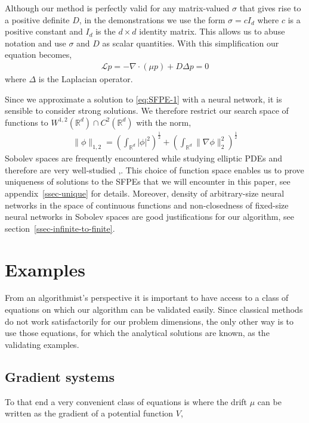 Although our method is perfectly valid for any matrix-valued $\sigma$ that gives rise to a positive definite $D$, in the demonstrations we use the form  $\sigma = c I_d$ where $c$ is a positive constant and $I_d$ is the $d\times d$ identity matrix. This allows us to abuse notation and use $\sigma$ and $D$ as scalar quantities. With this simplification our equation becomes, 
\begin{align}
    \mathcal L p= -\nabla\cdot(\mu p) + D\Delta p=0\label{eq:SFPE-1}
\end{align}
where $\Delta$ is the Laplacian operator. 

Since we approximate a solution to \eqref{eq:SFPE-1} with a neural network, it is sensible to consider strong solutions. We therefore  restrict our search space of functions to $W^{1, 2}(\mathbb R^d)\cap C^2(\mathbb R^d)$ with the norm,
\begin{align}
\|\phi\|_{1, 2} =\left(\int_{\mathbb R^d}|\phi|^2\right)^{\frac{1}{2}} + \left(\int_{\mathbb R^d}\|\nabla\phi\|_2^2\right)^{\frac{1}{2}}\label{eq:def-Sobolev-norm}
\end{align}
Sobolev spaces are frequently encountered while studying elliptic PDEs and therefore are very well-studied \cite{brezis2011functional},\cite{kilpelainen1994weighted}.  This choice of function space enables us to prove uniqueness of solutions to the SFPEs that we will encounter in this paper, see appendix~\ref{ssec-unique} for details. Moreover, density of arbitrary-size neural networks in the space of continuous functions \cite{pinkus1999approximation} and non-closedness of fixed-size neural networks in Sobolev spaces \cite{mahan2021nonclosedness} are good justifications for our algorithm, see section~\ref{ssec-infinite-to-finite}.

\section{Examples}\label{sec-examples}
From an algorithmist's perspective it is important to have access to a class of equations on which our algorithm can be validated easily. Since classical methods do not work satisfactorily for our problem dimensions, the only other way is to use those equations, for which the analytical solutions are known, as the validating examples.  
\subsection{Gradient systems}
To that end a very convenient class of equations is where the drift $\mu$ can be written as the gradient of a potential function $V$,

